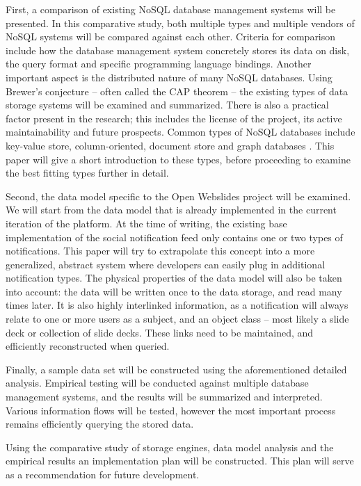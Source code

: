 \documentclass[fleqn,10pt]{voorstel}
\begin{document}
First, a comparison of existing NoSQL database management systems will be presented. In this comparative study, both multiple types and multiple vendors of NoSQL systems will be compared against each other. Criteria for comparison include how the database management system concretely stores its data on disk, the query format and specific programming language bindings. Another important aspect is the distributed nature of many NoSQL databases. Using Brewer's conjecture \autocite{Brewer2002} -- often called the CAP theorem -- the existing types of data storage systems will be examined and summarized. There is also a practical factor present in the research; this includes the license of the project, its active maintainability and future prospects.
Common types of NoSQL databases include key-value store, column-oriented, document store and graph databases \autocite{NayakPoriyaPoojary2003}. This paper will give a short introduction to these types, before proceeding to examine the best fitting types further in detail.

Second, the data model specific to the Open Webslides project will be examined. We will start from the data model that is already implemented in the current iteration of the platform. At the time of writing, the existing base implementation of the social notification feed only contains one or two types of notifications. This paper will try to extrapolate this concept into a more generalized, abstract system where developers can easily plug in additional notification types.
The physical properties of the data model will also be taken into account: the data will be written once to the data storage, and read many times later. It is also highly interlinked information, as a notification will always relate to one or more users as a subject, and an object class -- most likely a slide deck or collection of slide decks. These links need to be maintained, and efficiently reconstructed when queried.

Finally, a sample data set will be constructed using the aforementioned detailed analysis. Empirical testing will be conducted against multiple database management systems, and the results will be summarized and interpreted. Various information flows will be tested, however the most important process remains efficiently querying the stored data.

Using the comparative study of storage engines, data model analysis and the empirical results an implementation plan will be constructed. This plan will serve as a recommendation for future development.
\end{document}
